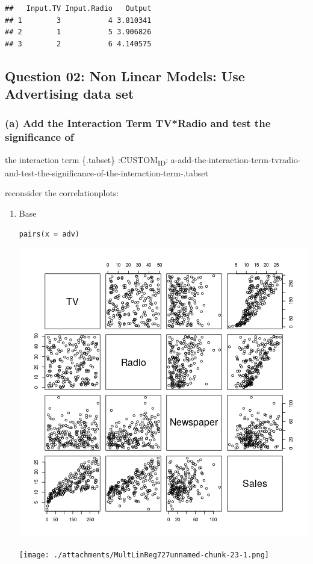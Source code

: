 \documentclass[11pt]{article}
\begin{document}
\begin{verbatim}
##   Input.TV Input.Radio   Output
## 1        3           4 3.810341
## 2        1           5 3.906826
## 3        2           6 4.140575
\end{verbatim}

\subsection{Question 02: Non Linear Models: Use Advertising data set}
\label{sec:org1581a7b}
\subsubsection{(a) Add the Interaction Term TV*Radio and test the significance of}
\label{sec:org7fd3f26}
the interaction term \{.tabset\}
:CUSTOM\textsubscript{ID}: a-add-the-interaction-term-tvradio-and-test-the-significance-of-the-interaction-term-.tabset

reconsider the correlationplots:

\begin{enumerate}
\item Base
\label{sec:orga8baa5a}
\begin{verbatim}
pairs(x = adv)
\end{verbatim}

\begin{center}
\includegraphics[width=.9\linewidth]{ResPlotAdvertisingMultLinReg2.png}
\end{center}

\begin{center}
\texttt{[image: ./attachments/MultLinReg727unnamed-chunk-23-1.png]}
\end{center}
\end{enumerate}
\end{document}
